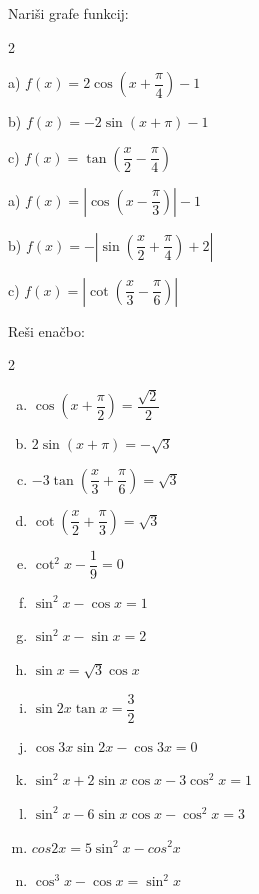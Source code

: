 \documentclass[a4paper,12pt]{letter}
\begin{document}
\begin{naloga}
    Nariši grafe funkcij:
    \begin{multicols}{2}

    a) $f(x)=2\cos(x+\dfrac{\pi}{4})-1$

    b) $f(x)=-2\sin(x+\pi)-1$

    c) $f(x)=\tan\left(\dfrac{x}{2}-\dfrac{\pi}{4}\right)$

       a) $f(x)=|\cos(x-\dfrac{\pi}{3})|-1$

    b) $f(x)=-|\sin\left(\dfrac{x}{2}+\dfrac{\pi}{4}\right)+2|$

    c) $f(x)=|\cot\left(\dfrac{x}{3}-\dfrac{\pi}{6}\right)|$
    \end{multicols}
\end{naloga}
\begin{naloga}
Reši enačbo:
     \begin{multicols}{2}
\begin{enumerate}[a)]
     \item  $\cos(x+\dfrac{\pi}{2})=\dfrac{\sqrt{2}}{2}$

     \item $2\sin(x+\pi)=-\sqrt{3}$

    \item  $-3\tan(\dfrac{x}{3}+\dfrac{\pi}{6})=\sqrt{3}$

    \item  $\cot(\dfrac{x}{2}+\dfrac{\pi}{3})=\sqrt{3}$

    \item $\cot^2 x-\dfrac{1}{9}=0$
   \item  $\sin^2 x-\cos x=1$

   \item  $\sin^2 x -\sin x=2$

   \item $\sin x=\sqrt{3}\cos x $
   \item $\sin 2x\tan x=\dfrac{3}{2}$

    \item  $\cos3x\sin2x-\cos 3x=0$

    \item  $\sin^2 x + 2\sin x\cos x - 3\cos^2 x = 1$

     \item  $\sin^2 x-6\sin x \cos x -\cos^2 x=3$

\item $cos 2x=5\sin^2x-cos^2x$
    
\item $\cos^3 x-\cos x=\sin^2x$
    \end{enumerate}
     \end{multicols}
\end{naloga}
\end{document}
